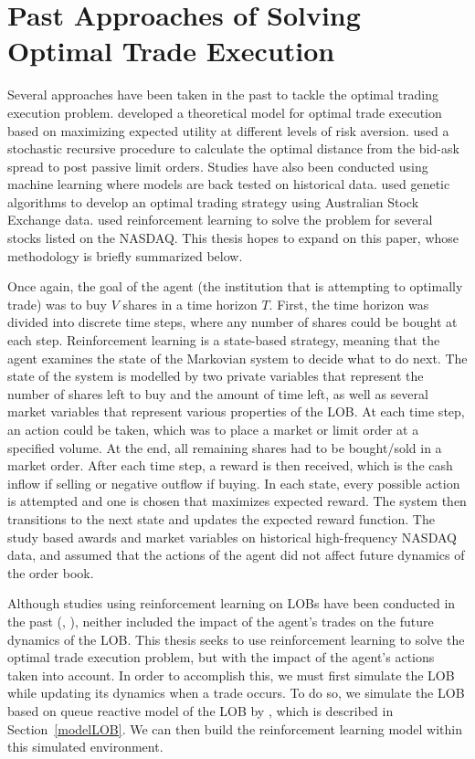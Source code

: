\section{Past Approaches of Solving Optimal Trade Execution}
Several approaches have been taken in the past to tackle the optimal trading execution problem. \cite{A1} developed a theoretical model for optimal trade execution based on maximizing expected utility at different levels of risk aversion. \cite{A2} used a stochastic recursive procedure to calculate the optimal distance from the bid-ask spread to post passive limit orders. Studies have also been conducted using machine learning where models are back tested on historical data. \cite{A5} used genetic algorithms to develop an optimal trading strategy using Australian Stock Exchange data. \cite{A3} used reinforcement learning to solve the problem for several stocks listed on the NASDAQ. This thesis hopes to expand on this paper, whose methodology is briefly summarized below.


Once again, the goal of the agent (the institution that is attempting to optimally trade) was to buy $V$ shares in a time horizon $T$. First, the time horizon was divided into discrete time steps, where any number of shares could be bought at each step. Reinforcement learning is a state-based strategy, meaning that the agent examines the state of the Markovian system to decide what to do next. The state of the system is modelled by two private variables that represent the number of shares left to buy and the amount of time left, as well as several market variables that represent various properties of the LOB. At each time step, an action could be taken, which was to place a market or limit order at a specified volume. At the end, all remaining shares had to be bought/sold in a market order.  After each time step, a reward is then received, which is the cash inflow if selling or negative outflow if buying. In each state, every possible action is attempted and one is chosen that maximizes expected reward. The system then transitions to the next state and updates the expected reward function. The study based awards and market variables on historical high-frequency NASDAQ data, and assumed that the actions of the agent did not affect future dynamics of the order book. 


Although studies using reinforcement learning on LOBs have been conducted in the past (\cite{A3}, \cite{A4}), neither included the impact of the agent’s trades on the future dynamics of the LOB. This thesis seeks to use reinforcement learning to solve the optimal trade execution problem, but with the impact of the agent’s actions taken into account. In order to accomplish this, we must first simulate the LOB while updating its dynamics when a trade occurs. To do so, we simulate the LOB based on queue reactive model of the LOB by \cite{A6}, which is described in Section~\ref{modelLOB}. We can then build the reinforcement learning model within this simulated environment.

